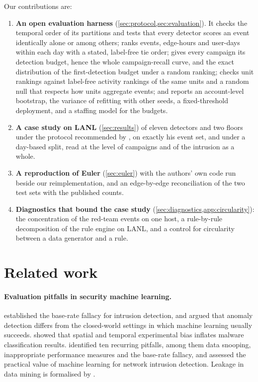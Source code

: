 \documentclass[11pt,a4paper]{article}
\begin{document}
Our contributions are:
\begin{enumerate}
\item \textbf{An open evaluation harness} (\cref{sec:protocol,sec:evaluation}). It checks the temporal order of its partitions and tests that every detector scores an event identically alone or among others; ranks events, edge-hours and user-days within each day with a stated, label-free tie order; gives every campaign its detection budget, hence the whole campaign-recall curve, and the exact distribution of the first-detection budget under a random ranking; checks unit rankings against label-free activity rankings of the same units and a random null that respects how units aggregate events; and reports an account-level bootstrap, the variance of refitting with other seeds, a fixed-threshold deployment, and a staffing model for the budgets.
\item \textbf{A case study on LANL} (\cref{sec:results}) of eleven detectors and two floors under the protocol recommended by \textcite{larroche2026fair}, on exactly his event set, and under a day-based split, read at the level of campaigns and of the intrusion as a whole.
\item \textbf{A reproduction of Euler} (\cref{sec:euler}) with the authors' own code run beside our reimplementation, and an edge-by-edge reconciliation of the two test sets with the published counts.
\item \textbf{Diagnostics that bound the case study} (\cref{sec:diagnostics,app:circularity}): the concentration of the red-team events on one host, a rule-by-rule decomposition of the rule engine on LANL, and a control for circularity between a data generator and a rule.
\end{enumerate}

\section{Related work}
\label{sec:related}

\paragraph{Evaluation pitfalls in security machine learning.}
\textcite{axelsson2000} established the base-rate fallacy for intrusion detection, and \textcite{sommer2010} argued that anomaly detection differs from the closed-world settings in which machine learning usually succeeds. \textcite{pendlebury2019} showed that spatial and temporal experimental bias inflates malware classification results. \textcite{arp2022} identified ten recurring pitfalls, among them data snooping, inappropriate performance measures and the base-rate fallacy, and \textcite{apruzzese2023sok} assessed the practical value of machine learning for network intrusion detection. Leakage in data mining is formalised by \textcite{kaufman2012leakage}.
\end{document}

